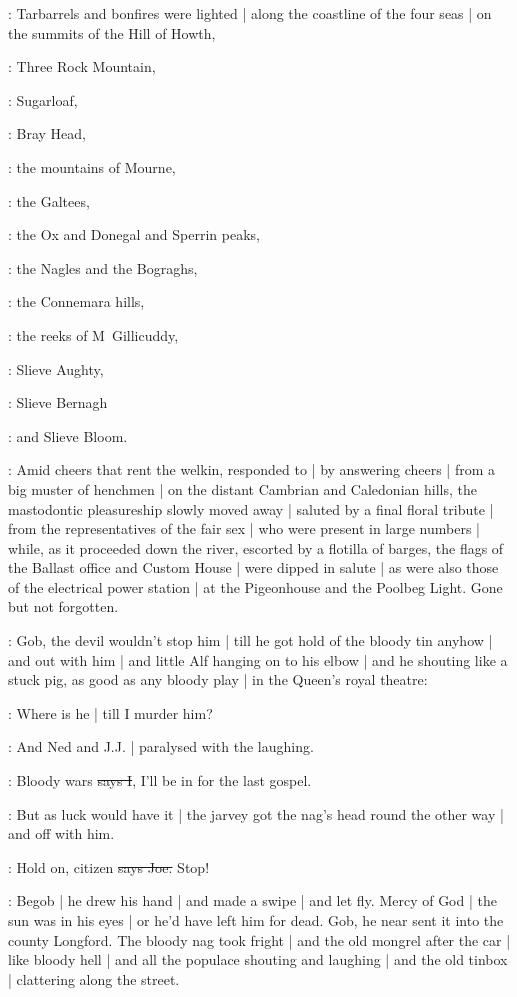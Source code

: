 :
Tarbarrels and bonfires were lighted |
along the coastline of the four seas |
on the summits of the Hill of Howth,

:
Three Rock Mountain,

:
Sugarloaf,

:
Bray Head,

:
the mountains of Mourne,

:
the Galtees,

:
the Ox and Donegal and Sperrin peaks,

:
the Nagles and the Bograghs,

:
the Connemara hills,

:
the reeks of M~Gillicuddy,

:
Slieve Aughty,

:
Slieve Bernagh

:
and Slieve Bloom.

:
Amid cheers that rent the welkin,
responded to |
by answering cheers |
from a big muster of henchmen |
on the distant Cambrian and Caledonian hills,
the mastodontic pleasureship slowly moved away |
saluted by a final floral tribute |
from the representatives of the fair sex |
who were present in large numbers |
while,
as it proceeded down the river,
escorted by a flotilla of barges,
the flags of the Ballast office and Custom House |
were dipped in salute |
as were also those of the electrical power station |
at the Pigeonhouse and the Poolbeg Light.
Gone but not forgotten.

\Nq:
Gob,
the devil wouldn't stop him |
till he got hold of the bloody tin anyhow |
and out with him |
and little Alf hanging on to his elbow |
and he shouting like a stuck pig,
as good as any bloody play |
in the Queen's royal theatre:

\citizen:
Where is he |
till I murder him?

\Nq:
And Ned and J.J. |
paralysed with the laughing.

:
Bloody wars
\sout{says I},
I'll be in for the last gospel.

\Nq:
But as luck would have it |
the jarvey got the nag's head round the other way |
and off with him.

\joe:
Hold on,
citizen
\sout{says Joe.}
Stop!

\Nq:
Begob |
he drew his hand |
and made a swipe |
and let fly.
Mercy of God |
the sun was in his eyes |
or he'd have left him for dead.
Gob,
he near sent it into the county Longford.
The bloody nag took fright |
and the old mongrel after the car |
like bloody hell |
and all the populace shouting and laughing |
and the old tinbox |
clattering along the street.

